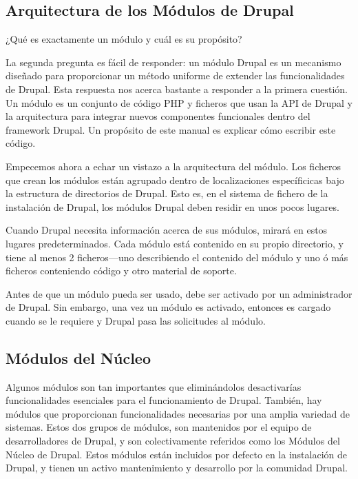 \documentclass[11pt]{article}
\begin{document}
\subsection{Arquitectura de los Módulos de Drupal}
\label{sec-2.1}


¿Qué es exactamente un módulo y cuál es su propósito?

La segunda pregunta es fácil de responder: un módulo Drupal es un
mecanismo diseñado para proporcionar un método uniforme de extender
las funcionalidades de Drupal. Esta respuesta nos acerca bastante a
responder a la primera cuestión. Un módulo es un conjunto de código
PHP y ficheros que usan la API de Drupal y la arquitectura para
integrar nuevos componentes funcionales dentro del framework
Drupal. Un propósito de este manual es explicar cómo escribir este
código.
 
Empecemos ahora a echar un vistazo a la arquitectura del módulo. Los
ficheros que crean los módulos están agrupado dentro de localizaciones
específicicas bajo la estructura de directorios de Drupal. Esto es, en
el sistema de fichero de la instalación de Drupal, los módulos Drupal
deben residir en unos pocos lugares. 

Cuando Drupal necesita información acerca de sus módulos, mirará en
estos lugares predeterminados. Cada módulo está contenido en su propio
directorio, y tiene al menos 2 ficheros—uno describiendo el contenido
del módulo y uno ó más ficheros conteniendo código y otro material de
soporte.  

Antes de que un módulo pueda ser usado, debe ser activado por un
administrador de Drupal. Sin embargo, una vez un módulo es activado,
entonces es cargado cuando se le requiere y Drupal pasa las
solicitudes al módulo.

\subsection{Módulos del Núcleo}
\label{sec-2.2}


Algunos módulos son tan importantes que eliminándolos desactivarías
funcionalidades esenciales para el funcionamiento de Drupal. También,
hay módulos que proporcionan funcionalidades necesarias por una amplia
variedad de sistemas. Estos dos grupos de módulos, son mantenidos por
el equipo de desarrolladores de Drupal, y son colectivamente referidos
como los Módulos del Núcleo de Drupal. Estos módulos están incluidos
por defecto en la instalación de Drupal, y tienen un activo
mantenimiento y desarrollo por la comunidad Drupal.
\end{document}
